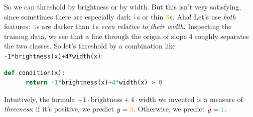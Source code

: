  So we can threshold by brightness or by width.  But this isn't very
  satisfying, since sometimes there are especially dark ${\blu{1}}$s or
  thin ${\rng{3}}$s.
  Aha!  Let's use \emph{both} features: ${\rng{3}}$s are darker than
  ${\blu{1}}$s \emph{even relative to their width}.  Inspecting the
  training data, we see that a line through the origin of slope $4$
  roughly separates the two classes.  So let's
  threshold by a combination like \texttt{-1*brightness(x)+4*width(x)}:
  \begin{lstlisting}[language=Python, basicstyle=\footnotesize\ttfamily]
    def condition(x):
      return -1*brightness(x)+4*width(x) > 0
  \end{lstlisting}
  Intuitively, the formula $-1\cdot \text{brightness} +4\cdot\text{width}$ we
  invented is a measure of \emph{threeness}: if it's positive, we predict
  $y={\rng 3}$.  Otherwise, we predict $y={\blu 1}$.



